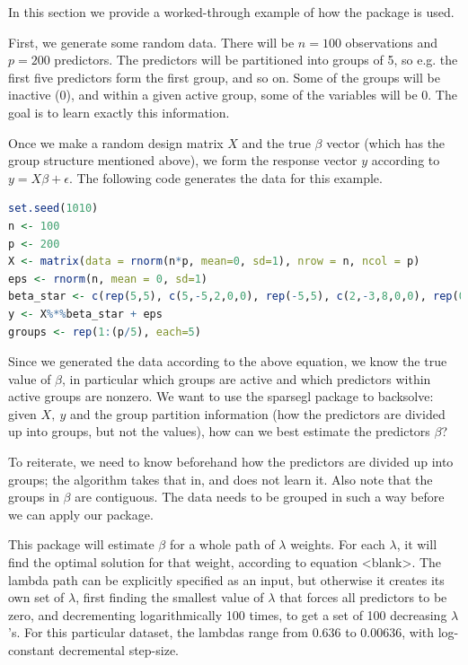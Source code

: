 \documentclass[titlepage]{article}
\begin{document}
In this section we provide a worked-through example of how the package is used. 

First, we generate some random data. There will be $n=100$ observations and $p=200$ predictors. The predictors will be partitioned into groups of 5, so e.g. the first five predictors form the first group, and so on. Some of the groups will be inactive ($0$), and within a given active group, some of the variables will be $0$. The goal is to learn exactly this information.

Once we make a random design matrix $X$ and the true $\beta$ vector (which has the group structure mentioned above), we form the response vector $y$ according to $y=X\beta + \epsilon$. The following code generates the data for this example.

\begin{lstlisting}[language=R]
set.seed(1010)
n <- 100
p <- 200
X <- matrix(data = rnorm(n*p, mean=0, sd=1), nrow = n, ncol = p)
eps <- rnorm(n, mean = 0, sd=1)
beta_star <- c(rep(5,5), c(5,-5,2,0,0), rep(-5,5), c(2,-3,8,0,0), rep(0,(p-20)))
y <- X%*%beta_star + eps
groups <- rep(1:(p/5), each=5)
\end{lstlisting}

Since we generated the data according to the above equation, we know the true value of $\beta$, in particular which groups are active and which predictors within active groups are nonzero. We want to use the sparsegl package to backsolve: given $X,\ y$ and the group partition information (how the predictors are divided up into groups, but not the values), how can we best estimate the predictors $\beta$?

To reiterate, we need to know beforehand how the predictors are divided up into groups; the algorithm takes that in, and does not learn it. Also note that the groups in $\beta$ are contiguous. The data needs to be grouped in such a way before we can apply our package.

This package will estimate $\beta$ for a whole path of $\lambda$ weights. For each $\lambda$, it will find the optimal solution for that weight, according to equation <blank>. The lambda path can be explicitly specified as an input, but otherwise it creates its own set of $\lambda$, first finding the smallest value of $\lambda$ that forces all predictors to be zero, and decrementing logarithmically 100 times, to get a set of 100 decreasing $\lambda$'s. For this particular dataset, the lambdas range from $0.636$ to $0.00636$, with log-constant decremental step-size.
\end{document}
